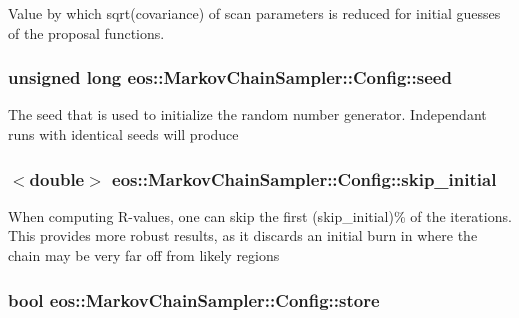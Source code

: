Value by which sqrt(covariance) of scan parameters is reduced for initial guesses of the proposal functions. \hypertarget{classeos_1_1MarkovChainSampler_1_1Config_ad969cd46104eb385033df4574079dc57}{
\subsubsection[{seed}]{\setlength{\rightskip}{0pt plus 5cm}unsigned long {\bf eos::MarkovChainSampler::Config::seed}}}
\label{classeos_1_1MarkovChainSampler_1_1Config_ad969cd46104eb385033df4574079dc57}
The seed that is used to initialize the random number generator. Independant runs with identical seeds will produce \hypertarget{classeos_1_1MarkovChainSampler_1_1Config_a8db6eb333e22a68f8b7abbd96b02b88c}{
\subsubsection[{skip\_\-initial}]{$<$double$>$ {\bf eos::MarkovChainSampler::Config::skip\_\-initial}}}
\label{classeos_1_1MarkovChainSampler_1_1Config_a8db6eb333e22a68f8b7abbd96b02b88c}
When computing R-\/values, one can skip the first (skip\_\-initial)\% of the iterations. This provides more robust results, as it discards an initial burn in where the chain may be very far off from likely regions \hypertarget{classeos_1_1MarkovChainSampler_1_1Config_a61732b63555e375ca22b7c31e3df12b6}{
\subsubsection[{store}]{\setlength{\rightskip}{0pt plus 5cm}bool {\bf eos::MarkovChainSampler::Config::store}}}
\label{classeos_1_1MarkovChainSampler_1_1Config_a61732b63555e375ca22b7c31e3df12b6}


